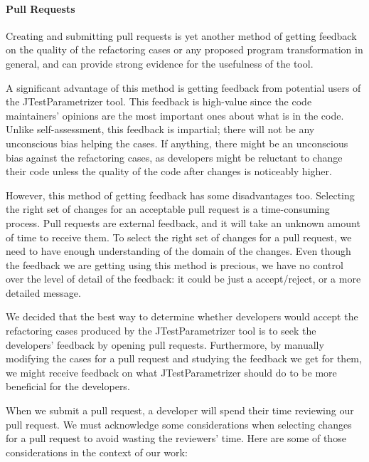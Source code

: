 \paragraph{Pull Requests}

Creating and submitting pull requests is yet another method of getting feedback on the quality of the refactoring cases or any proposed program transformation in general, and can provide strong evidence for the usefulness of the tool.

A significant advantage of this method is getting feedback from potential users of the JTestParametrizer tool. This feedback is high-value since the code maintainers' opinions are the most important ones about what is in the code. Unlike self-assessment, this feedback is impartial; there will not be any unconscious bias helping the cases. If anything, there might be an unconscious bias against the refactoring cases, as developers might be reluctant to change their code unless the quality of the code after changes is noticeably higher.

However, this method of getting feedback has some disadvantages too. Selecting the right set of changes for an acceptable pull request is a time-consuming process. Pull requests are external feedback, and it will take an unknown amount of time to receive them. To select the right set of changes for a pull request, we need to have enough understanding of the domain of the changes. Even though the feedback we are getting using this method is precious, we have no control over the level of detail of the feedback: it could be just a accept/reject, or a more detailed message.

We decided that the best way to determine whether developers would accept the refactoring cases produced by the JTestParametrizer tool is to seek the developers' feedback by opening pull requests. Furthermore, by manually modifying the cases for a pull request and studying the feedback we get for them, we might receive feedback on what JTestParametrizer should do to be more beneficial for the developers.

When we submit a pull request, a developer will spend their time reviewing our pull request. We must acknowledge some considerations when selecting changes for a pull request to avoid wasting the reviewers' time. Here are some of those considerations in the context of our work:

